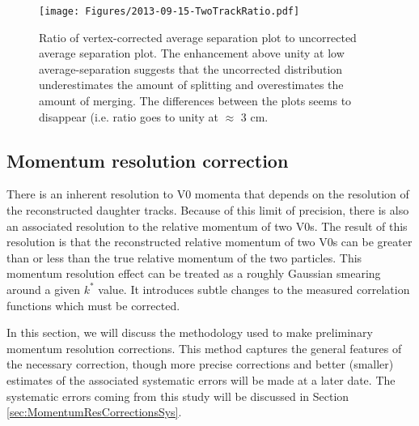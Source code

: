 \begin{figure}[hbtp]
\texttt{[image: Figures/2013-09-15-TwoTrackRatio.pdf]}
\caption[Ratio of corrected/uncorrected average-separation distributions]{Ratio of vertex-corrected average separation plot to uncorrected average separation plot.  
The enhancement above unity at low average-separation suggests that the uncorrected distribution underestimates the amount of splitting and overestimates the amount of merging. 
The differences between the plots seems to disappear (i.e. ratio goes to unity at $\approx$ 3 cm.}
\label{fig:TwoTrackRatio}
\end{figure}

\subsection{Momentum resolution correction}
\label{sec:MomentumResCorrection}

There is an inherent resolution to V0 momenta that depends on the resolution of the reconstructed daughter tracks.  
Because of this limit of precision, there is also an associated resolution to the relative momentum of two V0s.  
The result of this resolution is that the reconstructed relative momentum of two V0s can be greater than or less than the true relative momentum of the two particles.  
This momentum resolution effect can be treated as a roughly Gaussian smearing around a given $k^*$ value.  
It introduces subtle changes to the measured correlation functions which must be corrected.

In this section, we will discuss the methodology used to make preliminary momentum resolution corrections. 
This method captures the general features of the necessary correction, though more precise corrections and better (smaller) estimates of the associated systematic errors will be made at a later date.  
The systematic errors coming from this study will be discussed in Section \ref{sec:MomentumResCorrectionsSys}.

